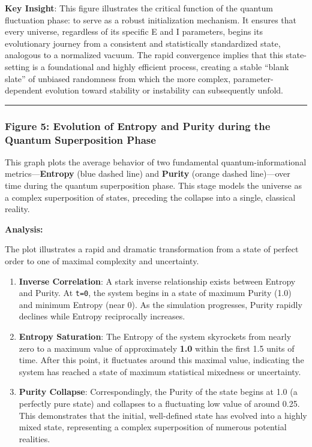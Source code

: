 \textbf{Key Insight}: This figure illustrates the critical function of
the quantum fluctuation phase: to serve as a robust initialization
mechanism. It ensures that every universe, regardless of its specific E
and I parameters, begins its evolutionary journey from a consistent and
statistically standardized state, analogous to a normalized vacuum. The
rapid convergence implies that this state-setting is a foundational and
highly efficient process, creating a stable ``blank slate'' of unbiased
randomness from which the more complex, parameter-dependent evolution
toward stability or instability can subsequently unfold.

\begin{center}\rule{0.5\linewidth}{0.5pt}\end{center}

\subsubsection{Figure 5: Evolution of Entropy and Purity during the
Quantum Superposition
Phase}\label{figure-5-evolution-of-entropy-and-purity-during-the-quantum-superposition-phase}

This graph plots the average behavior of two fundamental
quantum-informational metrics---\textbf{Entropy} (blue dashed line) and
\textbf{Purity} (orange dashed line)---over time during the quantum
superposition phase. This stage models the universe as a complex
superposition of states, preceding the collapse into a single, classical
reality.

\textbf{Analysis:}

The plot illustrates a rapid and dramatic transformation from a state of
perfect order to one of maximal complexity and uncertainty.

\begin{enumerate}
\def\labelenumi{\arabic{enumi}.}
\item
  \textbf{Inverse Correlation}: A stark inverse relationship exists
  between Entropy and Purity. At \texttt{t=0}, the system begins in a
  state of maximum Purity (1.0) and minimum Entropy (near 0). As the
  simulation progresses, Purity rapidly declines while Entropy
  reciprocally increases.
\item
  \textbf{Entropy Saturation}: The Entropy of the system skyrockets from
  nearly zero to a maximum value of approximately \textbf{1.0} within
  the first 1.5 units of time. After this point, it fluctuates around
  this maximal value, indicating the system has reached a state of
  maximum statistical mixedness or uncertainty.
\item
  \textbf{Purity Collapse}: Correspondingly, the Purity of the state
  begins at 1.0 (a perfectly pure state) and collapses to a fluctuating
  low value of around 0.25. This demonstrates that the initial,
  well-defined state has evolved into a highly mixed state, representing
  a complex superposition of numerous potential realities.
\end{enumerate}


